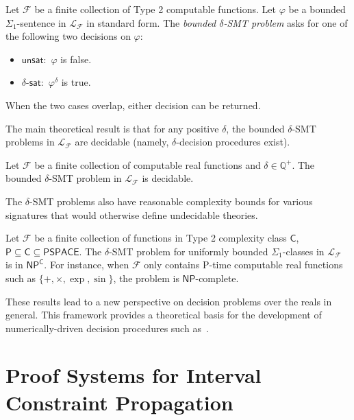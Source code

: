 \documentclass[envcountsect]{llncs}
\begin{document}
\begin{definition} Let
$\mathcal{F}$ be a finite collection of Type 2 computable functions. Let
$\varphi$ be a bounded $\Sigma_1$-sentence in $\mathcal{L}_{\mathcal{F}}$ in
standard form. The {\em bounded $\delta$-SMT problem} asks for one of the
following two decisions on $\varphi$:
\begin{itemize}
\item $\mathsf{unsat}:$ $\varphi$ is false.
\item $\delta$-$\mathsf{sat}:$ $\varphi^{\delta}$ is true.
\end{itemize}
When the two cases overlap, either decision can be returned.
\end{definition}

The main theoretical result is that for any positive
$\delta$, the bounded $\delta$-SMT problems in $\mathcal{L}_{\mathcal{F}}$ are
decidable (namely, $\delta$-decision
procedures exist).
\begin{theorem}[Decidability] Let $\mathcal{F}$ be a finite collection
of computable real functions and $\delta\in \mathbb{Q}^+$. The bounded
$\delta$-SMT problem in $\mathcal{L}_{\mathcal{F}}$ is decidable.
\end{theorem}

The $\delta$-SMT problems also have reasonable complexity bounds for various
signatures that would otherwise define undecidable theories.
\begin{theorem}[Complexity]
Let $\mathcal{F}$ be a finite collection of functions in Type 2 complexity class
$\mathsf{C}$, $\mathsf{P}\subseteq\mathsf{C}\subseteq\mathsf{PSPACE}$. The
$\delta$-SMT problem for uniformly bounded $\Sigma_1$-classes in
$\mathcal{L}_{\mathcal{F}}$ is in $\mathsf{NP^C}$. For instance, when
$\mathcal{F}$ only contains {\sf P}-time computable real functions such as
$\{+, \times, \exp, \sin\}$, the problem is $\mathsf{NP}$-complete.
\end{theorem}

These results lead to a
new perspective on decision problems over the reals in general.
This framework provides a theoretical basis for the development of
numerically-driven decision procedures such as~\cite{}.

\section{Proof Systems for Interval Constraint Propagation}\label{icp}
\end{document}
